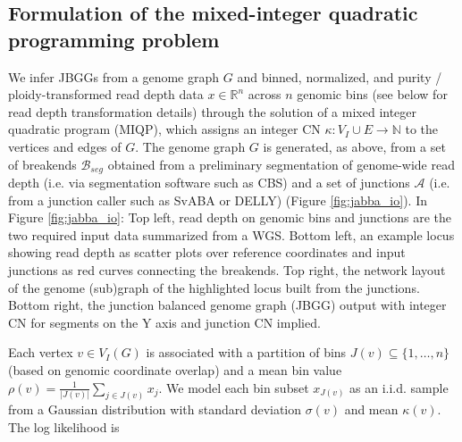 \documentclass[phd,tocprelim]{cornell}
\begin{document}

\subsection{Formulation of the mixed-integer quadratic programming problem}
We infer JBGGs from a genome graph $G$ and binned, normalized, and purity / ploidy-transformed read depth data $x \in \mathbb{R}^n$ across $n$ genomic bins (see below for read depth transformation details)  through the solution of a mixed integer quadratic program (MIQP), which assigns an integer CN $\kappa:V_I \cup E \rightarrow \mathbb{N}$ to the vertices and edges of $G$.  The genome graph $G$ is generated, as above, from a set of breakends $\mathcal{B}_{seg}$ obtained from a preliminary segmentation of genome-wide read depth (i.e. via segmentation software such as CBS) and a set of junctions $\mathcal{A}$ (i.e. from a junction caller such as SvABA or DELLY) (Figure \ref{fig:jabba_io}). In Figure \ref{fig:jabba_io}: Top left, read depth on genomic bins and junctions are the two required input data summarized from a WGS. Bottom left, an example locus showing read depth as scatter plots over reference coordinates and input junctions as red curves connecting the breakends. Top right, the network layout of the genome (sub)graph of the highlighted locus built from the junctions. Bottom right, the junction balanced genome graph (JBGG) output with integer CN for segments on the Y axis and junction CN implied.

Each vertex $v \in V_I(G)$ is associated with a partition of bins $J(v) \subseteq \{1, \ldots, n\}$ (based on genomic coordinate overlap) and a mean bin value $\rho(v) = \frac{1}{|J(v)|}\sum_{j \in J(v)} x_j$.  We model each bin subset $x_{J(v)}$ as an i.i.d. sample from a Gaussian distribution with standard deviation $\sigma(v)$ and mean $\kappa(v)$.  The log likelihood is
\end{document}

